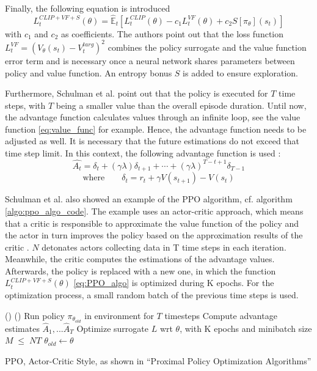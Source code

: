 Finally, the following equation is introduced
\begin{equation}\label{eq:PPO_algo}
    L_{t}^{CLIP+VF+S}(\theta) = \hat{\mathbb{E}}_{t} \left[ L_{t}^{CLIP}(\theta) - c_{1}L_{t}^{VF}(\theta) + c_{2}S[\pi_{\theta}](s_{t}) \right]
\end{equation}
with $c_{1}$ and $c_{2}$ as coefficients. The authors point out that the loss function \\
$L_{t}^{VF} = (V_{\theta}(s_{t})-V_{t}^{targ})^2$ combines the policy surrogate and the value function error term and is necessary once a neural network shares parameters between policy and value function. An entropy bonus $S$ is added to ensure exploration.

Furthermore, Schulman et al. point out that the policy is executed for $T$ time steps, with $T$ being a smaller value than the overall episode duration. Until now, the advantage function calculates values through an infinite loop, see the value function \eqref{eq:value_func} for example. Hence, the advantage function needs to be adjusted as well. It is necessary that the future estimations do not exceed that time step limit. In this context, the following advantage function is used \cite{scwo17}:
\begin{equation}\label{eq:advantage_func}
    \hat{A_t} = \delta_t+(\gamma \lambda)\delta_{t+1}+ \cdots + (\gamma \lambda)^{T-t+1}\delta_{T-1}
\end{equation}
\begin{equation}\label{eq:advantage_func_delta}
    \textrm{where} \qquad \delta_t = r_t + \gamma V(s_{t+1}) - V(s_t)
\end{equation}

Schulman et al. also showed an example of the PPO algorithm, cf. algorithm \ref{algo:ppo_algo_code}. The example uses an actor-critic approach, which means that a critic is responsible to approximate the value function of the policy and the actor in turn improves the policy based on the approximation results of the critic \cite{kots03}. $N$ detonates actors collecting data in T time steps in each iteration. Meanwhile, the critic computes the estimations of the advantage values. Afterwards, the policy is replaced with a new one, in which the function $L_{t}^{CLIP+VF+S}(\theta)$ \eqref{eq:PPO_algo} is optimized during K epochs. For the optimization process, a small random batch of the previous time steps is used.

\begin{algorithm}[H]
    \DontPrintSemicolon
    \For(){}{
        \For(){}{
            Run policy $\pi_{\theta_{old}}$ in environment for $T$ timesteps \;
            Compute advantage estimates $\hat{A}_{1},...\hat{A}_{T}$
        }
        Optimize surrogate $L$ wrt $\theta$, with K epochs and minibatch size $M \; \leq \; NT$ \;
        $\theta_{old} \leftarrow \theta$
    }
    \caption{PPO, Actor-Critic Style, as shown in ``Proximal Policy Optimization Algorithms'' \cite{scwo17}}\label{algo:ppo_algo_code}
\end{algorithm}

